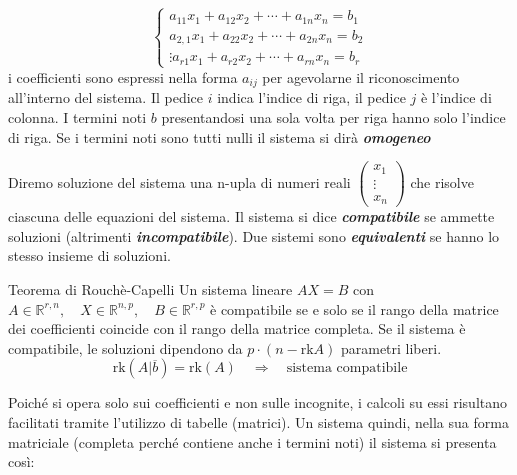 \documentclass[x11names]{article}
\begin{document}
 $$ 
 {\begin{cases}a_{11}x_{1}+a_{12}x_{2}+\cdots +a_{1n}x_{n}=b_{1}\\a_{2,1}x_{1}+a_{22}x_{2}+\cdots +a_{2n}x_{n}=b_{2}\\\vdots a_{r1}x_{1}+a_{r2}x_{2}+\cdots +a_{rn}x_{n}=b_{r}\end{cases}} 
 $$
 i coefficienti sono espressi nella forma $a_{ij}$ per agevolarne il riconoscimento all'interno del sistema. Il  pedice $i$ indica l'indice di riga, il pedice $j$ è l'indice di colonna. I termini noti $b$ presentandosi una sola volta per riga hanno solo l'indice di riga.
 Se i termini noti sono tutti nulli il sistema si dirà \textbf{\textit{omogeneo}}

 Diremo soluzione del sistema una n-upla di numeri reali $\begin{pmatrix}x_{1}\\ \vdots \\ x_{n}\end{pmatrix}$ che risolve ciascuna delle equazioni del sistema. Il sistema si dice \textbf{\textit{compatibile}} se ammette soluzioni (altrimenti \textbf{\textit{incompatibile}}).  Due sistemi sono \textbf{\textit{equivalenti}} se hanno lo stesso insieme di soluzioni. 
 
\begin{center}

\end{center}

\begin{center}
\colorbox{myred}{\begin{minipage}{5.75in}
\begin{redes}{Teorema di Rouchè-Capelli}
Un sistema lineare $AX = B$  con $A \in \mathbb{R}^{r,n}, \quad X \in \mathbb{R}^{n,p}, \quad B \in \mathbb{R}^{r,p}$ è compatibile se e solo se il rango della matrice
dei coefficienti coincide con il rango della matrice completa. Se il sistema è compatibile, le soluzioni dipendono da $p \cdot \left(n-\text{rk}A\right)$ parametri liberi.
\[
	\text{rk}\left(A|\overline{b}\right) = \text{rk}\left(A\right) \quad \Rightarrow \quad \text{sistema compatibile}
\] 
\end{redes}
\end{minipage}}        
\end{center}

Poiché si opera solo sui coefficienti e non sulle incognite, i calcoli su essi risultano facilitati tramite l'utilizzo di tabelle (matrici). Un sistema quindi, nella sua forma matriciale (completa perché contiene anche i termini noti) il sistema si presenta così:
\end{document}
